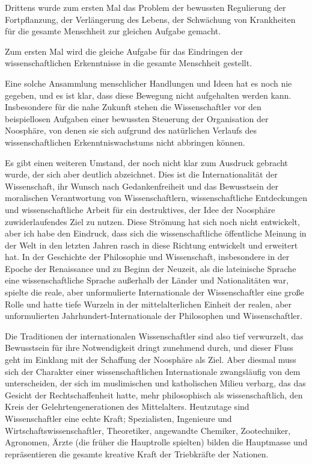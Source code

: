 \documentclass[11pt,a4paper]{book}
\begin{document}
Drittens wurde zum ersten Mal das Problem der bewussten Regulierung der Fortpflanzung, der Verlängerung des Lebens, der Schwächung von Krankheiten für die gesamte Menschheit zur gleichen Aufgabe gemacht. 

Zum ersten Mal wird die gleiche Aufgabe für das Eindringen der wissenschaftlichen Erkenntnisse in die gesamte Menschheit gestellt. 

Eine solche Ansammlung menschlicher Handlungen und Ideen hat es noch nie gegeben, und es ist klar, dass diese Bewegung nicht aufgehalten werden kann. Insbesondere für die nahe Zukunft stehen die Wissenschaftler vor den beispiellosen Aufgaben einer bewussten Steuerung der Organisation der Noosphäre, von denen sie sich aufgrund des natürlichen Verlaufs des wissenschaftlichen Erkenntniswachstums nicht abbringen können. 

Es gibt einen weiteren Umstand, der noch nicht klar zum Ausdruck gebracht wurde, der sich aber deutlich abzeichnet. Dies ist die Internationalität der Wissenschaft, ihr Wunsch nach Gedankenfreiheit und das Bewusstsein der moralischen Verantwortung von Wissenschaftlern, wissenschaftliche Entdeckungen und wissenschaftliche Arbeit für ein destruktives, der Idee der Noosphäre zuwiderlaufendes Ziel zu nutzen. Diese Strömung hat sich noch nicht entwickelt, aber ich habe den Eindruck, dass sich die wissenschaftliche öffentliche Meinung in der Welt in den letzten Jahren rasch in diese Richtung entwickelt und erweitert hat. In der Geschichte der Philosophie und Wissenschaft, insbesondere in der Epoche der Renaissance und zu Beginn der Neuzeit, als die lateinische Sprache eine wissenschaftliche Sprache außerhalb der Länder und Nationalitäten war, spielte die reale, aber unformulierte Internationale der Wissenschaftler eine große Rolle und hatte tiefe Wurzeln in der mittelalterlichen Einheit der realen, aber unformulierten Jahrhundert-Internationale der Philosophen und Wissenschaftler. 

Die Traditionen der internationalen Wissenschaftler sind also tief verwurzelt, das Bewusstsein für ihre Notwendigkeit dringt zunehmend durch, und dieser Fluss geht im Einklang mit der Schaffung der Noosphäre als Ziel. Aber diesmal muss sich der Charakter einer wissenschaftlichen Internationale zwangsläufig von dem unterscheiden, der sich im muslimischen und katholischen Milieu verbarg, das das Gesicht der Rechtschaffenheit hatte, mehr philosophisch als wissenschaftlich, den Kreis der Gelehrtengenerationen des Mittelalters. Heutzutage sind Wissenschaftler eine echte Kraft; Spezialisten, Ingenieure und Wirtschaftswissenschaftler, Theoretiker, angewandte Chemiker, Zootechniker, Agronomen, Ärzte (die früher die Hauptrolle spielten) bilden die Hauptmasse und repräsentieren die gesamte kreative Kraft der Triebkräfte der Nationen. 
\end{document}
